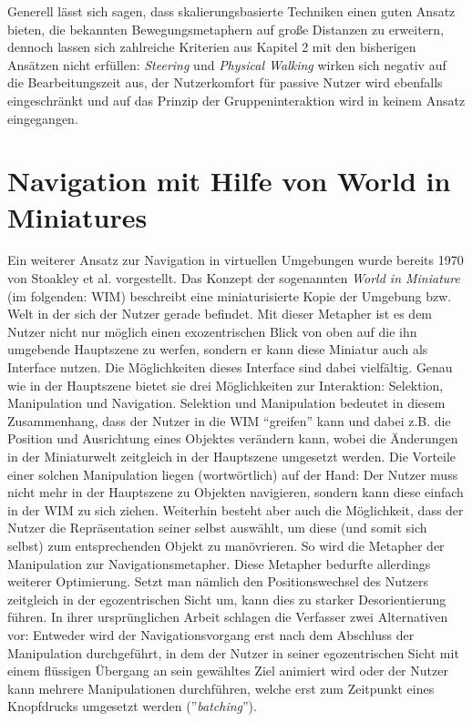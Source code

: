 Generell lässt sich sagen, dass skalierungsbasierte Techniken einen guten Ansatz bieten, die bekannten Bewegungsmetaphern auf große Distanzen zu erweitern, dennoch lassen sich zahlreiche Kriterien aus Kapitel 2 mit den bisherigen Ansätzen nicht erfüllen:
\textit{Steering} und \textit{Physical Walking} wirken sich negativ auf die Bearbeitungszeit aus, der Nutzerkomfort für passive Nutzer wird ebenfalls eingeschränkt und auf das Prinzip der Gruppeninteraktion wird in keinem Ansatz eingegangen.

\section{Navigation mit Hilfe von World in Miniatures}

Ein weiterer Ansatz zur Navigation in virtuellen Umgebungen wurde bereits 1970 von Stoakley et al. \cite{Stoakley2010VirtualWIM} vorgestellt. Das Konzept der sogenannten \textit{World in Miniature} (im folgenden: WIM) beschreibt eine miniaturisierte Kopie der Umgebung bzw. Welt in der sich der Nutzer gerade befindet. Mit dieser Metapher ist es dem Nutzer nicht nur möglich einen exozentrischen Blick von oben auf die ihn umgebende Hauptszene zu werfen, sondern er kann diese Miniatur auch als Interface nutzen. Die Möglichkeiten dieses Interface sind dabei vielfältig. Genau wie in der Hauptszene bietet sie drei Möglichkeiten zur Interaktion: Selektion, Manipulation und Navigation.
Selektion und Manipulation bedeutet in diesem Zusammenhang, dass der Nutzer in die WIM “greifen” kann und dabei z.B. die Position und Ausrichtung eines Objektes verändern kann, wobei die Änderungen in der Miniaturwelt zeitgleich in der Hauptszene umgesetzt werden. Die Vorteile einer solchen Manipulation liegen (wortwörtlich) auf der Hand: Der Nutzer muss nicht mehr in der Hauptszene zu Objekten navigieren, sondern kann diese einfach in der WIM zu sich ziehen. 
Weiterhin besteht aber auch die Möglichkeit, dass der Nutzer die Repräsentation seiner selbst auswählt, um diese (und somit sich selbst) zum entsprechenden Objekt zu manövrieren. So wird die Metapher der Manipulation zur Navigationsmetapher.
Diese Metapher bedurfte allerdings weiterer Optimierung. Setzt man nämlich den Positionswechsel des Nutzers zeitgleich in der egozentrischen Sicht um, kann dies zu starker Desorientierung führen. In ihrer ursprünglichen Arbeit schlagen die Verfasser zwei Alternativen vor: Entweder wird der Navigationsvorgang erst nach dem Abschluss der Manipulation durchgeführt, in dem der Nutzer in seiner egozentrischen Sicht mit einem flüssigen Übergang an sein gewähltes Ziel animiert wird oder der Nutzer kann mehrere Manipulationen durchführen, welche erst zum Zeitpunkt eines Knopfdrucks umgesetzt werden (”\textit{batching}”). 
